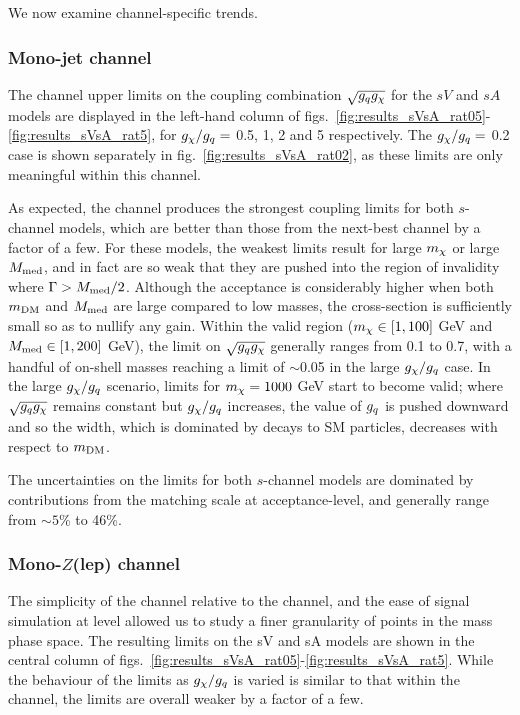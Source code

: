 We now examine channel-specific trends.

\subsubsection{Mono-jet channel}

The \monojet channel upper limits on the coupling combination $\sqrt{g_q g_{\chi}}$ for the $sV$ and $sA$ models are displayed in the left-hand column of figs.~\ref{fig:results_sVsA_rat05}-\ref{fig:results_sVsA_rat5}, for $g_{\chi}/g_q =$ 0.5, 1, 2 and 5 respectively. The $g_{\chi}/g_q =$ 0.2 case is shown separately in fig.~\ref{fig:results_sVsA_rat02}, as these limits are only meaningful within this channel.

As expected, the \monojet channel produces the strongest coupling limits for both $s$-channel models, which are better than those from the next-best \monoZ channel by a factor of a few. For these models, the weakest limits result for large $m_{\chi}$ or large $M_{\mathrm{med}}$, and in fact are so weak that they are pushed into the region of invalidity where $\Gamma > M_{\mathrm{med}}/2$. Although the acceptance is considerably higher when both $m_{\mathrm{DM}}$ and $M_{\mathrm{med}}$ are large compared to low masses, the cross-section is sufficiently small so as to nullify any gain. Within the valid region ($m_{\chi} \in [1, 100]$ GeV and $M_{\mathrm{med}} \in [1, 200]$ GeV), the limit on $\sqrt{g_q g_{\chi}}$ generally ranges from 0.1 to 0.7, with a handful of on-shell masses reaching a limit of $\sim$0.05 in the large $g_{\chi} / g_q$ case. In the large $g_{\chi}/g_q$ scenario, limits for $m_{\chi} = 1000$ GeV start to become valid; where $\sqrt{g_q g_{\chi}}$ remains constant but $g_{\chi} / g_q$ increases, the value of $g_q$ is pushed downward and so the width, which is dominated by decays to SM particles, decreases with respect to $m_{\mathrm{DM}}$.

The uncertainties on the limits for both $s$-channel models are dominated by contributions from the matching scale at acceptance-level, and generally range from $\sim5$\% to 46\%.

\subsubsection{Mono-$Z$(lep) channel}

The simplicity of the \monoZ channel relative to the \monojet channel, and the ease of signal simulation at \MG level allowed us to study a finer granularity of points in the mass phase space. The resulting limits on the sV and sA models are shown in the central column of figs.~\ref{fig:results_sVsA_rat05}-\ref{fig:results_sVsA_rat5}. While the behaviour of the limits as $g_{\chi} / g_q$ is varied is similar to that within the \monojet channel, the \monoZ limits are overall weaker by a factor of a few.

